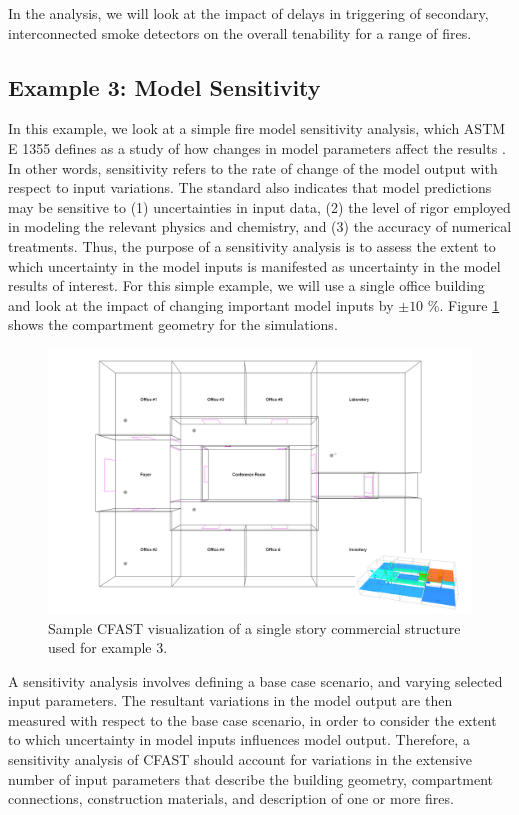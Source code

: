 \documentclass[12pt,twoside]{book}
\begin{document}
In the analysis, we will look at the impact of delays in triggering of secondary, interconnected smoke detectors on the overall tenability for a range of fires.

\subsection{Example 3: Model Sensitivity}

In this example, we look at a simple fire model sensitivity analysis, which ASTM E 1355 defines as a study of how changes in model parameters affect the results \cite{CFAST:ASTM:E1355}. In other words, sensitivity refers to the rate of change of the model output with respect to input variations. The standard also indicates that model predictions may be sensitive to (1) uncertainties in input data, (2) the level of rigor employed in modeling the relevant physics and chemistry, and (3) the accuracy of numerical treatments. Thus, the purpose of a sensitivity analysis is to assess the extent to which uncertainty in the model inputs is manifested as uncertainty in the model results of interest. For this simple example, we will use a single office building and look at the impact of changing important model inputs by $\pm 10$ \%. Figure \ref{sensitivity_geometry} shows the compartment geometry for the simulations.

\begin{figure}[h!]
\centering
\includegraphics[width=6.5in]{FIGURES/Sensitivity.png}
\caption{Sample CFAST visualization of a single story commercial structure used for example 3.}
\label{sensitivity_geometry}
\end{figure}

A sensitivity analysis involves defining a base case scenario, and varying selected input parameters. The resultant variations in the model output are then measured with respect to the base case scenario, in order to consider the extent to which uncertainty in model inputs influences model output. Therefore, a sensitivity analysis of CFAST should account for variations in the extensive number of input parameters that describe the building geometry, compartment connections, construction materials, and description of one or more fires.
\end{document}
